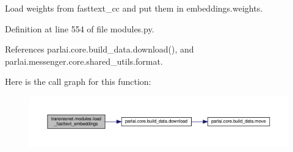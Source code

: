 \begin{DoxyVerb}Load weights from fasttext_cc and put them in embeddings.weights.\end{DoxyVerb}
 

Definition at line 554 of file modules.\+py.



References parlai.\+core.\+build\+\_\+data.\+download(), and parlai.\+messenger.\+core.\+shared\+\_\+utils.\+format.

Here is the call graph for this function\+:
\nopagebreak
\begin{figure}[H]
\begin{center}
\leavevmode
\includegraphics[width=350pt]{namespacetransresnet_1_1modules_a5caddff64a700c7def7e2479168afdfe_cgraph}
\end{center}
\end{figure}
